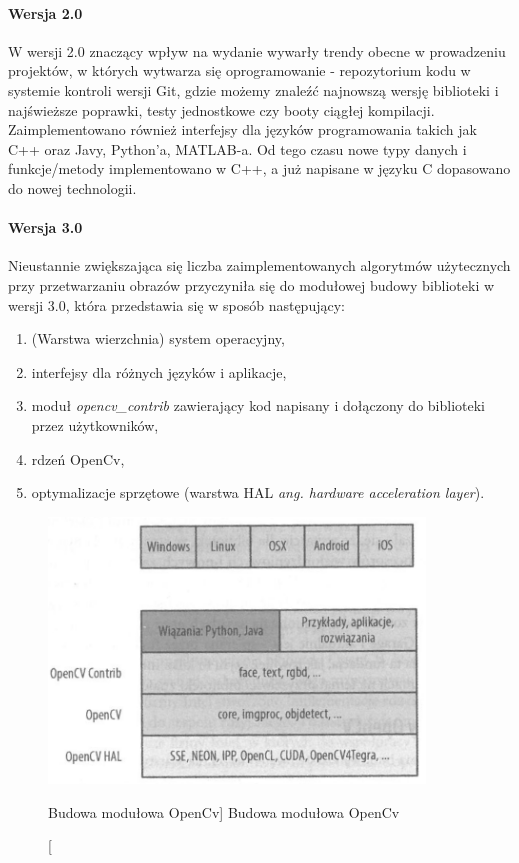 \documentclass[a4paper,12pt]{article}
\begin{document}
\paragraph{Wersja 2.0}
W wersji 2.0 znaczący wpływ na wydanie wywarły trendy obecne w prowadzeniu projektów, w których wytwarza się oprogramowanie - repozytorium kodu w systemie kontroli wersji Git, gdzie możemy znaleźć najnowszą wersję biblioteki i najświeższe poprawki, testy jednostkowe czy booty ciągłej kompilacji. 
Zaimplementowano również interfejsy dla języków programowania takich jak C++ oraz Javy, Python’a, MATLAB-a.
Od tego czasu nowe typy danych i funkcje/metody implementowano w C++, a już napisane w języku C dopasowano do nowej technologii.
\paragraph{Wersja 3.0}
Nieustannie zwiększająca się liczba zaimplementowanych algorytmów użytecznych przy przetwarzaniu obrazów przyczyniła się do modułowej budowy biblioteki w wersji 3.0, która przedstawia się w sposób następujący:


\begin{enumerate}
	\item (Warstwa wierzchnia) system operacyjny,
	\item interfejsy dla różnych języków i aplikacje,
	\item moduł \textit {opencv\_contrib} zawierający kod napisany i dołączony do biblioteki przez użytkowników,
	\item rdzeń OpenCv,
	\item optymalizacje sprzętowe (warstwa HAL \textit {ang. hardware acceleration layer}).
\end{enumerate} 


\begin{figure}[!ht]   %
	\begin{center}
		\includegraphics[width=10cm] {budowaModulowa.png} 
	\end{center}
	\caption
	[Budowa modułowa OpenCv]  %
	{Budowa modułowa OpenCv}  %
\end{figure}
\end{document}
